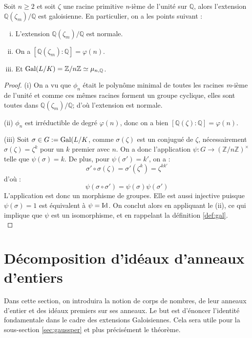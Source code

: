 \documentclass[a4paper]{article} %
\numberwithin{section}{part}
\numberwithin{equation}{section}
\newcommand\nroot[1]{\textit{#1}-ième}
\newcommand\zmodn[1]{\mathbb{Z}/#1\mathbb{Z}}
\newcommand\zmodninv[1]{(\mathbb{Z}/#1\mathbb{Z})^{\times}}
\newcommand\QQ{\mathbb{Q}}
\begin{document}
\begin{prop}
\label{prop:cyclgal}
Soit $n \geq 2$ et soit $\zeta$ une racine primitive \nroot{n} de l'unité sur 
$\QQ$, alors l'extension $\QQ(\zeta_m)/\QQ$ est galoisienne. En particulier, on 
a les points suivant :

\begin{enumerate}[(i)]
\item L'extension $\QQ(\zeta_m)/\QQ$ est normale.

\item On a $[\QQ(\zeta_m):\QQ] = \varphi(n)$.

\item Et $\textup{Gal}(L/K) = \zmodn{n} \simeq \mu_{n,\QQ}$.
\end{enumerate}
\end{prop}
\begin{proof}
(i) On a vu que $\phi_n$ était le polynôme minimal de toutes les racines 
\nroot{m} de l'unité et comme ces mêmes racines forment un groupe 
cyclique, elles sont toutes dans $\QQ(\zeta_m)/\QQ$; d'où l'extension est
normale.\par
(ii) $\phi_n$ est irréductible de degré $\varphi(n)$, donc on a bien
$[\QQ(\zeta):\QQ] = \varphi(n)$.\par
(iii) Soit $\sigma\in G := \textup{Gal}(L/K$, comme $\sigma(\zeta)$ est un
conjugué de $\zeta$, nécessairement $\sigma(\zeta) = \zeta^k$ pour un $k$
premier avec $n$. On a donc l'application $\psi : G \to \zmodninv{n}$ telle que
$\psi(\sigma) = k$. De plus, pour $\psi(\sigma') = k'$, on a :
\[\sigma'\circ\sigma(\zeta) = \sigma'(\zeta^k) = \zeta^{kk'}\]
d'où :
\[\psi(\sigma\circ\sigma') = \psi(\sigma)\psi(\sigma')\]
L'application est donc un morphisme de groupes. Elle est aussi injective puisque
$\psi(\sigma) = 1$ est équivalent à $\psi = \textup{Id}$. On conclut alors en
appliquant le (ii), ce qui implique que $\psi$ est un isomorphisme, et en 
rappelant la définition \ref{def:gal}.\\
\end{proof}

\section{Décomposition d'idéaux d'anneaux d'entiers}
Dans cette section, on introduira la notion de corps de nombres, de leur
anneaux d'entier et des idéaux premiers sur ses anneaux. Le but est d'énoncer 
l'identité fondamentale dans le cadre des extensions Galoisiennes. Cela sera 
utile pour la sous-section \ref{sec:gaussper} et plus précisément le 
théorème. %
\end{document}
